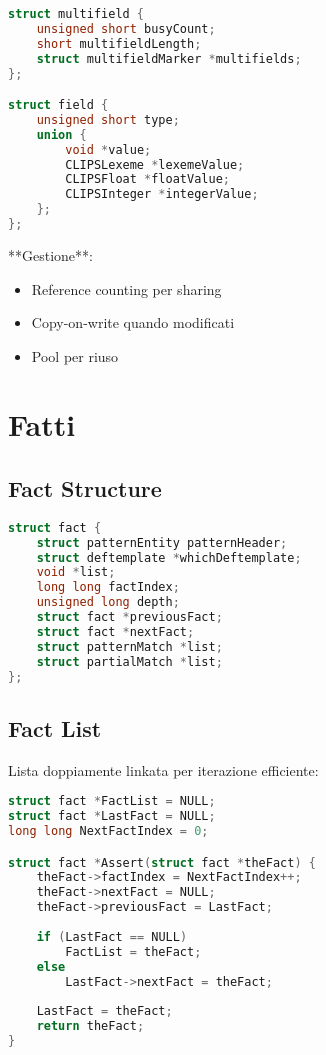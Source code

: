 \begin{lstlisting}[language=C]
struct multifield {
    unsigned short busyCount;
    short multifieldLength;
    struct multifieldMarker *multifields;
};

struct field {
    unsigned short type;
    union {
        void *value;
        CLIPSLexeme *lexemeValue;
        CLIPSFloat *floatValue;
        CLIPSInteger *integerValue;
    };
};
\end{lstlisting}

**Gestione**:
\begin{itemize}
\item Reference counting per sharing
\item Copy-on-write quando modificati
\item Pool per riuso
\end{itemize}

\section{Fatti}

\subsection{Fact Structure}

\begin{lstlisting}[language=C]
struct fact {
    struct patternEntity patternHeader;
    struct deftemplate *whichDeftemplate;
    void *list;
    long long factIndex;
    unsigned long depth;
    struct fact *previousFact;
    struct fact *nextFact;
    struct patternMatch *list;
    struct partialMatch *list;
};
\end{lstlisting}

\subsection{Fact List}

Lista doppiamente linkata per iterazione efficiente:

\begin{lstlisting}[language=C]
struct fact *FactList = NULL;
struct fact *LastFact = NULL;
long long NextFactIndex = 0;

struct fact *Assert(struct fact *theFact) {
    theFact->factIndex = NextFactIndex++;
    theFact->nextFact = NULL;
    theFact->previousFact = LastFact;
    
    if (LastFact == NULL)
        FactList = theFact;
    else
        LastFact->nextFact = theFact;
    
    LastFact = theFact;
    return theFact;
}
\end{lstlisting}

